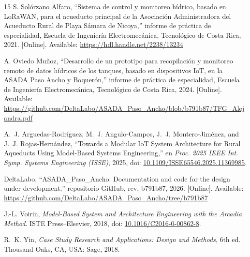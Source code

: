 \documentclass[conference]{IEEEtran}
\begin{document}
\begin{thebibliography}{15}
S. Solórzano Alfaro, ``Sistema de control y monitoreo hídrico, basado en LoRaWAN, para el acueducto principal de la Asociación Administradora del Acueducto Rural de Playa Sámara de Nicoya,'' informe de práctica de especialidad, Escuela de Ingeniería Electromecánica, Tecnológico de Costa Rica, 2021. [Online]. Available: \url{https://hdl.handle.net/2238/13234}

A. Oviedo Muñoz, ``Desarrollo de un prototipo para recopilación y monitoreo remoto de datos hídricos de los tanques, basado en dispositivos IoT, en la ASADA Paso Ancho y Boquerón,'' informe de práctica de especialidad, Escuela de Ingeniería Electromecánica, Tecnológico de Costa Rica, 2024. [Online]. Available: \url{https://github.com/DeltaLabo/ASADA_Paso_Ancho/blob/b791b87/TFG_Alejandra.pdf}

A.~J. Arguedas-Rodríguez, M.~J. Angulo-Campos, J.~J. Montero-Jiménez, and J.~J. Rojas-Hernández, ``Towards a Modular IoT System Architecture for Rural Aqueducts Using Model-Based Systems Engineering,'' en \emph{Proc. 2025 IEEE Int. Symp. Systems Engineering (ISSE)}, 2025, doi: \url{10.1109/ISSE65546.2025.11369985}.

DeltaLabo, ``ASADA\_Paso\_Ancho: Documentation and code for the design under development,'' repositorio GitHub, rev. b791b87, 2026. [Online]. Available: \url{https://github.com/DeltaLabo/ASADA_Paso_Ancho/tree/b791b87}

J.-L. Voirin, \emph{Model-Based System and Architecture Engineering with the Arcadia Method}. ISTE Press--Elsevier, 2018, doi: \url{10.1016/C2016-0-00862-8}.

R.~K. Yin, \emph{Case Study Research and Applications: Design and Methods}, 6th ed. Thousand Oaks, CA, USA: Sage, 2018.

\end{thebibliography}
\end{document}
